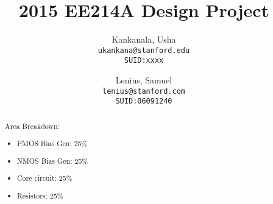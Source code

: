 \documentclass[12pt,english]{article}
\begin{document}




\author{
  Kankanala, Usha\\
  \texttt{ukankana@stanford.edu}\\
  \texttt{SUID:xxxx}
  \and
  Lenius, Samuel\\
  \texttt{lenius@stanford.com}\\
  \texttt{SUID:06091240}
}

\title{2015 EE214A Design Project}

\maketitle


\begin{abstract}
  Area Breakdown:
  \begin{addmargin}[1em]{0em}
  \begin{itemize}
    \item PMOS Bias Gen: 25\%
    \item NMOS Bias Gen: 25\%
    \item Core circuit: 25\%
    \item Resistors: 25\%
  \end{itemize}
  \end{addmargin}
\end{abstract}

\pagebreak

\end{document}
